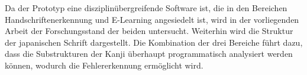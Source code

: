 Da der Prototyp eine disziplinübergreifende Software ist, 
die in den Bereichen Handschriftenerkennung und E-Learning angesiedelt ist,
wird in der vorliegenden Arbeit der Forschungsstand der beiden untersucht.
Weiterhin wird die Struktur der japanischen Schrift dargestellt.
Die Kombination der drei Bereiche führt dazu, dass die Substrukturen der
Kanji überhaupt programmatisch analysiert werden können,
wodurch die Fehlererkennung ermöglicht wird.















